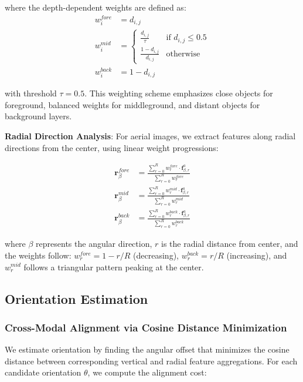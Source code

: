 where the depth-dependent weights are defined as:
\begin{align}
w_i^{fore} &= d_{i,j} \\
w_i^{mid} &= \begin{cases} 
\frac{d_{i,j}}{\tau} & \text{if } d_{i,j} \leq 0.5 \\
\frac{1-d_{i,j}}{d_{i,j}} & \text{otherwise}
\end{cases} \\
w_i^{back} &= 1 - d_{i,j}
\end{align}

with threshold $\tau = 0.5$. This weighting scheme emphasizes close objects for foreground, balanced weights for middleground, and distant objects for background layers.

\textbf{Radial Direction Analysis}: For aerial images, we extract features along radial directions from the center, using linear weight progressions:

\begin{align}
\mathbf{r}_\beta^{fore} &= \frac{\sum_{r=0}^{R} w_r^{fore} \cdot \mathbf{f}_{\beta,r}^a}{\sum_{r=0}^{R} w_r^{fore}} \\
\mathbf{r}_\beta^{mid} &= \frac{\sum_{r=0}^{R} w_r^{mid} \cdot \mathbf{f}_{\beta,r}^a}{\sum_{r=0}^{R} w_r^{mid}} \\
\mathbf{r}_\beta^{back} &= \frac{\sum_{r=0}^{R} w_r^{back} \cdot \mathbf{f}_{\beta,r}^a}{\sum_{r=0}^{R} w_r^{back}}
\end{align}

where $\beta$ represents the angular direction, $r$ is the radial distance from center, and the weights follow: $w_r^{fore} = 1-r/R$ (decreasing), $w_r^{back} = r/R$ (increasing), and $w_r^{mid}$ follows a triangular pattern peaking at the center.

\subsection{Orientation Estimation}

\subsubsection{Cross-Modal Alignment via Cosine Distance Minimization}

We estimate orientation by finding the angular offset that minimizes the cosine distance between corresponding vertical and radial feature aggregations. For each candidate orientation $\theta$, we compute the alignment cost:

